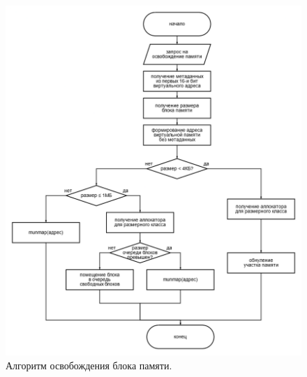 \begin{figure}[!h]
	\begin{center}
		\includegraphics[scale=0.5]{images/deallocation.png}
		\caption{Алгоритм освобождения блока памяти.}
		\label{structure}
	\end{center}
\end{figure}